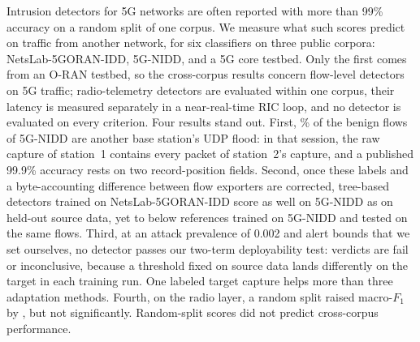Intrusion detectors for 5G networks are often reported with more than 99\% accuracy on a random split of one corpus. We measure what such scores predict on traffic from another network, for six classifiers on three public corpora: NetsLab-5GORAN-IDD, 5G-NIDD, and a 5G core testbed. Only the first comes from an O-RAN testbed, so the cross-corpus results concern flow-level detectors on 5G traffic; radio-telemetry detectors are evaluated within one corpus, their latency is measured separately in a near-real-time RIC loop, and no detector is evaluated on every criterion. Four results stand out. First, \RCopiesPct\% of the benign flows of 5G-NIDD are another base station's UDP flood: in that session, the raw capture of station~1 contains every packet of station~2's capture, and a published 99.9\% accuracy rests on two record-position fields. Second, once these labels and a byte-accounting difference between flow exporters are corrected, tree-based detectors trained on NetsLab-5GORAN-IDD score as well on 5G-NIDD as on held-out source data, yet \RGapTreeCleanMin{} to \RGapTreeCleanMax{} below references trained on 5G-NIDD and tested on the same flows. Third, at an attack prevalence of 0.002 and alert bounds that we set ourselves, no detector passes our two-term deployability test: verdicts are fail or inconclusive, because a threshold fixed on source data lands differently on the target in each training run. One labeled target capture helps more than three adaptation methods. Fourth, on the radio layer, a random split raised macro-$F_1$ by \RRadSessAvg{}, but not significantly. Random-split scores did not predict cross-corpus performance.
